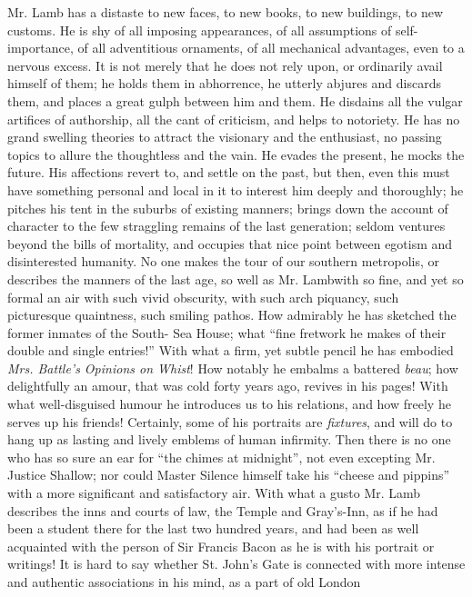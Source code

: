 Mr. Lamb has a distaste to new faces, to new books, to new
buildings, to new customs. He is shy of all imposing appearances,
of all assumptions of self-importance, of all adventitious
ornaments, of all mechanical advantages, even to a nervous
excess. It is not merely that he does not rely upon, or ordinarily
avail himself of them; he holds them in abhorrence, he utterly
abjures and discards them, and places a great gulph between him
and them. He disdains all the vulgar artifices of authorship, all
the cant of criticism, and helps to notoriety. He has no grand
swelling theories to attract the visionary and the enthusiast, no
passing topics to allure the thoughtless and the vain. He evades
the present, he mocks the future. His affections revert to, and
settle on the past, but then, even this must have something
personal and local in it to interest him deeply and thoroughly; he
pitches his tent in the suburbs of existing manners; brings down
the account of character to the few straggling remains of the last
generation; seldom ventures beyond the bills of mortality, and
occupies that nice point between egotism and disinterested
humanity. No one makes the tour of our southern metropolis, or
describes the manners of the last age, so well as Mr.
Lamb\textemdash with so fine, and yet so formal an air\textemdash
with such vivid obscurity, with such arch piquancy, such
picturesque quaintness, such smiling pathos. How admirably he has
sketched the former inmates of the South- Sea House; what ``fine
fretwork he makes of their double and single entries!'' With what
a firm, yet subtle pencil he has embodied \emph{Mrs.  Battle's
  Opinions on Whist}! How notably he embalms a battered
\emph{beau}; how delightfully an amour, that was cold forty years
ago, revives in his pages! With what well-disguised humour he
introduces us to his relations, and how freely he serves up his
friends! Certainly, some of his portraits are \emph{fixtures}, and
will do to hang up as lasting and lively emblems of human
infirmity. Then there is no one who has so sure an ear for ``the
chimes at midnight'', not even excepting Mr. Justice Shallow; nor
could Master Silence himself take his ``cheese and pippins'' with
a more significant and satisfactory air. With what a gusto
Mr. Lamb describes the inns and courts of law, the Temple and
Gray's-Inn, as if he had been a student there for the last two
hundred years, and had been as well acquainted with the person of
Sir Francis Bacon as he is with his portrait or writings! It is
hard to say whether St. John's Gate is connected with more intense
and authentic associations in his mind, as a part of old London
